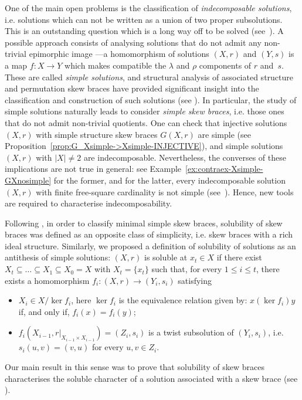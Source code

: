 \documentclass[12pt, a4paper, english]{article}
\theoremstyle{definition}
\theoremstyle{remark}
\begin{document}
One of the main open problems is the classification of \emph{indecomposable solutions}, i.e. solutions which can not be written as a union of two proper subsolutions. This is an outstanding question which is a long way off to be solved (see~\cite{CastelliCatinoPinto19, CedoOkninski23, ColazzoFerraraTrombetti25, JedlickaPilitowska23}). A possible approach consists of analysing solutions that do not admit any non-trivial epimorphic image ---a homomorphism of solutions $(X,r)$ and $(Y,s)$ is a map $f\colon X \rightarrow Y$ which makes compatible the $\lambda$ and $\rho$ components of $r$ and~$s$. These are called \emph{simple solutions}, and structural analysis of associated structure and permutation skew braces have provided significant insight into the classification and construction of such solutions (see \cite{CedoOkninski21,ColazzoJespersKubatVanAntwerpen25}). In particular, the study of simple solutions naturally leads to consider  \emph{simple skew braces}, i.e. those ones that do not admit non-trivial quotients. One can check that injective solutions $(X,r)$ with simple structure skew braces $G(X,r)$ are simple (see Proposition~\ref{prop:G_Xsimple->Xsimple-INJECTIVE}), and simple solutions $(X,r)$ with $|X|\neq 2$ are indecomposable. Nevertheless, the converses of these implications are not true in general: see Example~\ref{ex:contraex-Xsimple-GXnosimple} for the former, and for the latter, every indecomposable solution $(X,r)$ with finite free-square cardinality is not simple  (see~\cite{CedoOkninski23}). Hence, new tools are required to characterise indecomposability.



Following \cite{BallesterEstebanJimenezPerezC24-solubleskewbraces},  in order to classify minimal simple skew braces, solubility of skew braces was defined as an opposite class of simplicity, i.e. skew braces with a rich ideal structure. Similarly, we proposed a definition of solubility of solutions as an antithesis of simple solutions: $(X,r)$ is soluble at $x_t\in X$ if there exist $X_{t} \subseteq \ldots \subseteq X_1 \subseteq X_0 = X$ with $X_{t} = \{x_{t}\}$ such that, for every $1\leq i \leq t$, there exists a homomorphism  $f_i \colon (X,r) \rightarrow (Y_i,s_i)$ satisfying
\begin{itemize}
\item $X_i \in X/\ker f_i$, here $\ker f_i$ is the equivalence relation given by: $x(\ker f_i)y$ if, and only if, $f_i(x) = f_i(y)$;
\item $f_i(X_{i-1}, r|_{X_{i-1}\times X_{i-1}}) = (Z_i,s_i)$ is a twist subsolution of $(Y_i, s_i)$,  i.e. $s_i(u,v) = (v,u)$ for every $u,v\in Z_i$.
\end{itemize}
Our main result in this sense was to prove that solubility of skew braces characterises the soluble character of a solution associated with a skew brace (see \cite[Theorem~C]{BallesterEstebanJimenezPerezC24-solubleskewbraces}).
\end{document}
